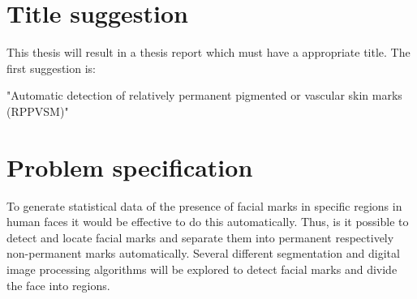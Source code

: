 \documentclass{article}
\begin{document}
\section{Title suggestion}

This thesis will result in a thesis report which must have a appropriate title. The first suggestion is: 

\begin{displayquote}
"Automatic detection of relatively permanent pigmented or vascular skin marks (RPPVSM)"
\end{displayquote}

\section{Problem specification}

To generate statistical data of the presence of facial marks in specific regions in human faces it would be effective to do this automatically. Thus, is it possible to detect and locate facial marks and separate them into permanent respectively non-permanent marks automatically. Several different segmentation and digital image processing algorithms will be explored to detect facial marks and divide the face into regions. 










\newpage


\end{document}

